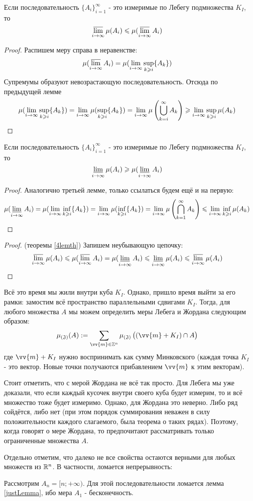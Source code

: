 \begin{lemma}
	Если последовательность $\{A_i\}_{i = 1}^\infty$ - это измеримые по Лебегу подмножества $K_I$, то
	\[
		\varlimsup_{i \to \infty} \mu(A_i) \le \mu(\varlimsup_{i \to \infty} A_i)
	\]
\end{lemma}

\begin{proof}
	Распишем меру справа в неравенстве:
	\[
		\mu(\varlimsup_{i \to \infty} A_i) = \mu(\liml_{i \to \infty} \sup_{k \ge i} \{A_k\})
	\]
	Супремумы образуют невозрастающую последовательность. Отсюда по предыдущей лемме
	\[
		\mu(\liml_{i \to \infty} \sup_{k \ge i} \{A_k\}) = \liml_{i \to \infty} \mu(\sup_{k \ge i} \{A_k\}) = \liml_{i \to \infty} \mu\left(\bigcup_{k = i}^\infty A_k\right) \ge \liml_{i \to \infty} \sup_{k \ge i} \mu(A_k)
	\]
\end{proof}

\begin{lemma}
	Если последовательность $\{A_i\}_{i = 1}^\infty$ - это измеримые по Лебегу подмножества $K_I$, то
	\[
		\varliminf_{i \to \infty} \mu(A_i) \ge \mu(\varliminf_{i \to \infty} A_i)
	\]
\end{lemma}

\begin{proof}
	Аналогично третьей лемме, только ссылаться будем ещё и на первую:
	\[
		\mu(\varliminf_{i \to \infty} A_i) = \mu(\liml_{i \to \infty} \inf_{k \ge i} \{A_k\}) = \liml_{i \to \infty} \mu(\inf_{k \ge i} \{A_k\}) = \liml_{i \to \infty} \mu\left(\bigcap_{k = 1}^\infty A_k\right) \le \liml_{i \to \infty} \inf_{k \ge i} \mu(A_k)
	\]
\end{proof}

\begin{proof} (теоремы \ref{4lemth})
	Запишем неубывающую цепочку:
	\[
		\varlimsup_{i \to \infty} \mu(A_i) \le \mu(\varlimsup_{i \to \infty} A_i) = \mu(\varliminf_{i \to \infty} A_i) \le \varliminf_{i \to \infty} \mu(A_i) \le \varlimsup_{i \to \infty} \mu(A_i)
	\]
\end{proof}

\begin{note}
	Всё это время мы жили внутри куба $K_I$. Однако, пришло время выйти за его рамки: замостим всё пространство параллельными сдвигами $K_I$. Тогда, для любого множества $A$ мы можем определить меры Лебега и Жордана следующим образом:
	\[
		\jlm(A) := \sum_{\vv{m} \in \Z^n} \jlm\big((\vv{m} + K_I) \cap A\big)
	\]
	где $\vv{m} + K_I$ нужно воспринимать как сумму Минковского (каждая точка $K_I$ - это вектор. Новые точки получаются прибавлением $\vv{m}$ к этим векторам).
	
	Стоит отметить, что с мерой Жордана не всё так просто. Для Лебега мы уже доказали, что если каждый кусочек внутри своего куба будет измерим, то и всё множество тоже будет измеримо. Однако, для Жордана это неверно. Либо ряд сойдётся, либо нет (при этом порядок суммирования неважен в силу положительности каждого слагаемого, была теорема о таких рядах). Поэтому, когда говорят о мере Жордана, то предпочитают рассматривать только ограниченные множества $A$.
\end{note}

\begin{note}
	Отдельно отметим, что далеко не все свойства остаются верными для любых множеств из $\R^n$. В частности, ломается непрерывность:
	
	Рассмотрим $A_n = [n; +\infty)$. Для этой последовательности ломается лемма \ref{justLemma}, ибо мера $A_1$ - бесконечность.
\end{note}
